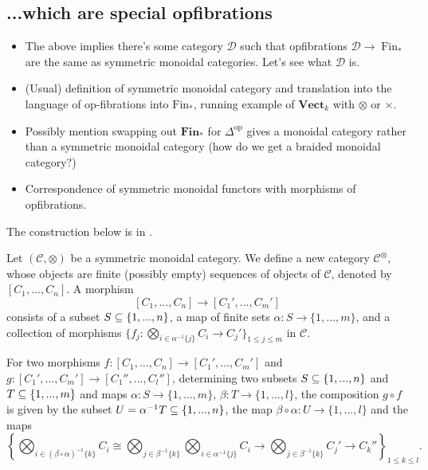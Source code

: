 \documentclass{MetricNotes2023}
\def\subq{\ensuremath\subseteq}
\DeclareMathOperator{\Fin}{Fin}
\begin{document}
\subsection{...which are special opfibrations}

\begin{itemize}
\item The above implies there's some category \(\mathcal{D}\) such that opfibrations \(\mathcal{D}\to \Fin_*\) are the same as symmetric monoidal categories. Let's see what \(\mathcal{D}\) is.
\item (Usual) definition of symmetric monoidal category and translation into the language of op-fibrations into \(\text{Fin}_*\), running example of \(\textbf{Vect}_k\) with \(\otimes\) or \(\times\). 
\item Possibly mention swapping out \(\textbf{Fin}_*\) for \(\Delta^{\text{op}}\) gives a monoidal category rather than a symmetric monoidal category (how do we get a braided monoidal category?)
\item Correspondence of symmetric monoidal functors with morphisms of opfibrations.
\end{itemize}

The construction below is in \autocite{higheralgebra}. 

Let \((\mathcal{C}, \otimes)\) be a symmetric monoidal category. We define a new category \(\mathcal{C}^\otimes\), whose objects are finite (possibly empty) sequences of objects of \(\mathcal{C}\), denoted by \([C_1, ..., C_n]\). A morphism 
\[[C_1, ..., C_n]\to [C_1', ..., C_m']\]
consists of a subset \(S \subq \{1, ..., n\}\), a map of finite sets \(\alpha : S \to \{1, ..., m\}\), and a collection of morphisms \(\{f_j : \bigotimes_{i \in \alpha^{-1}\{j\}} C_i \to C_j'\}_{1 \leq j \leq m}\) in \(\mathcal{C}\). 

For two morphisms \(f : [C_1, ..., C_n]\to [C_1', ..., C_m']\) and \(g : [C_1', ..., C_m']\to[C_1'', ..., C_l'']\), determining two subsets \(S \subq \{1, ..., n\}\) and \(T \subq \{1, ..., m\}\) and maps \(\alpha : S \to \{1, ..., m\}\), \(\beta : T \to \{1, ..., l\}\), the composition \(g \circ f\) is given by the subset \(U = \alpha^{-1}T \subq \{1, ..., n\}\), the map \(\beta \circ \alpha : U \to \{1, ..., l\}\) and the maps 
\[\left\{\bigotimes_{i \in (\beta \circ \alpha)^{-1}\{k\}} C_i \cong \bigotimes_{j \in \beta^{-1}\{k\}}\bigotimes_{i \in \alpha^{-1}\{j\}}C_i \to \bigotimes_{j \in \beta^{-1}\{k\}}C_j' \to C_k''\right\}_{1 \leq k \leq l}.\] 
\end{document}
